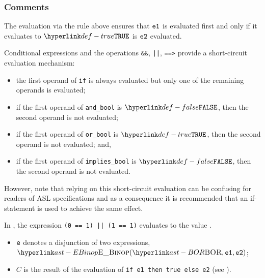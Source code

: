 \FormallyParagraph
\begin{mathpar}
\end{mathpar}

\subsubsection{Comments}
The evaluation via the rule above ensures that $\veone$ is evaluated first and
only if it evaluates to $\True$ is $\vetwo$ evaluated.


Conditional expressions and the operations \texttt{\&\&}, \texttt{||},
\texttt{==>} provide a short-circuit evaluation mechanism:

\begin{itemize}
\item the first operand of \texttt{if} is always evaluated but only one of the
remaining operands is evaluated;
\item if the first operand of \texttt{and\_bool} is $\False$, then the second operand is not evaluated;
\item if the first operand of \texttt{or\_bool} is $\True$, then the second operand is not evaluated; and,
\item if the first operand of \texttt{implies\_bool} is $\False$, then the
second operand is not evaluated.
\end{itemize}

However, note that relying on this short-circuit evaluation can be confusing
for readers of ASL specifications and as a consequence it is recommended that
an if-statement is used to achieve the same effect.

In , the expression \texttt{(0 == 1) || (1 == 1)} evaluates to the value \True.

\ProseParagraph
\AllApply
\begin{itemize}
\item $\ve$ denotes a disjunction of two expressions, $\EBinop(\BOR, \veone, \vetwo)$;
\item $C$ is the result of the evaluation of
      \texttt{if e1 then true else e2} (see ).
\end{itemize}

